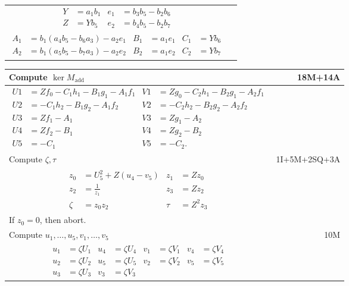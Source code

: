 \begin{tabularx}{\linewidth}{|Xr|}
  \hline
  {\begin{align*}
    Y &= a_1b_1 & e_1 &= b_3b_5 - b_2b_6 \\
    Z &= Yb_5   & e_2 &= b_4b_5 - b_2b_7
  \end{align*}} & \\
  {\begin{align*}
    A_1 &= b_1(a_4b_5 - b_6a_3) - a_2e_1 & B_1 &= a_1e_1 & C_1 &= Yb_6 \\
    A_2 &= b_1(a_5b_5 - b_7a_3) - a_2e_2 & B_2 &= a_1e_2 & C_2 &= Yb_7
  \end{align*}} & \\
  \hline
\end{tabularx}

\pagebreak
\begin{tabularx}{\linewidth}{|Xr|}
  \hline
    Compute $\ker M_{\text{add}}$ & 18M+14A \\
  \hline
  {\begin{align*}
    U1 &= Zf_0 - C_1h_1 - B_1g_1 - A_1f_1 & V1 &= Zg_0 - C_2h_1 - B_2g_1 - A_2f_1 \\
    U2 &=      - C_1h_2 - B_1g_2 - A_1f_2 & V2 &=      - C_2h_2 - B_2g_2 - A_2f_2 \\
    U3 &= Zf_1 - A_1 & V3 &= Zg_1 - A_2 \\
    U4 &= Zf_2 - B_1 & V4 &= Zg_2 - B_2 \\
    U5 &=      - C_1 & V5 &=      - C_2.
  \end{align*}} & \\
  \hline
    Compute $\zeta, \tau$ & 1I+5M+2SQ+3A \\
  \hline
  {\begin{align*}
    z_0 &= U_5^2 + Z(u_4 - v_5) & z_1 &= Zz_0 \\
    z_2 &= \frac 1 {z_1} & z_3 &= Zz_2 \\
    \zeta &= z_0z_2 & \tau  &= Z^2z_3
  \end{align*}} & \\
  If $z_0 = 0$, then abort. & \\
  \hline
    Compute $u_1, \ldots, u_5, v_1, \ldots, v_5$ & 10M \\
  \hline
  {\begin{align*}
    u_1 &= \zeta U_1 & u_4 &= \zeta U_4 & v_1 &= \zeta V_1 & v_4 &= \zeta V_4 \\
    u_2 &= \zeta U_2 & u_5 &= \zeta U_5 & v_2 &= \zeta V_2 & v_5 &= \zeta V_5 \\
    u_3 &= \zeta U_3                    & v_3 &= \zeta V_3
  \end{align*}} & \\
  \hline
\end{tabularx}

